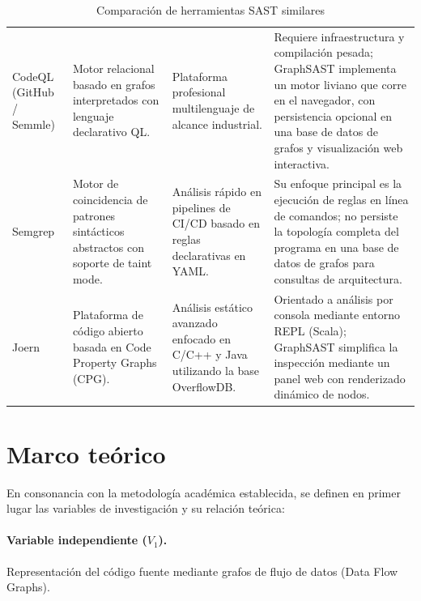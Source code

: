 \begin{table}[H]
    \centering
    \caption{Comparación de herramientas SAST similares}
    \label{tab:comparativa}
    \small
    \begin{tabularx}{\textwidth}{>{\raggedright\arraybackslash}p{2.6cm} L L L}
        \toprule
         &  &  &  \\
        \midrule
        CodeQL (GitHub / Semmle) \newline \citep{codeql} & Motor relacional basado en grafos interpretados con lenguaje declarativo QL. & Plataforma profesional multilenguaje de alcance industrial. & Requiere infraestructura y compilación pesada; GraphSAST implementa un motor liviano que corre en el navegador, con persistencia opcional en una base de datos de grafos y visualización web interactiva. \\
        Semgrep \citep{semgreptaint} & Motor de coincidencia de patrones sintácticos abstractos con soporte de taint mode. & Análisis rápido en pipelines de CI/CD basado en reglas declarativas en YAML. & Su enfoque principal es la ejecución de reglas en línea de comandos; no persiste la topología completa del programa en una base de datos de grafos para consultas de arquitectura. \\
        Joern \citep{joern} & Plataforma de código abierto basada en Code Property Graphs (CPG). & Análisis estático avanzado enfocado en C/C++ y Java utilizando la base OverflowDB. & Orientado a análisis por consola mediante entorno REPL (Scala); GraphSAST simplifica la inspección mediante un panel web con renderizado dinámico de nodos. \\
        \bottomrule
    \end{tabularx}
\end{table}

\section{Marco teórico}\label{sec:n3.2}

En consonancia con la metodología académica establecida, se definen en primer lugar las variables de investigación y su relación teórica:

\paragraph{Variable independiente ($V_1$).} Representación del código fuente mediante grafos de flujo de datos (Data Flow Graphs).

